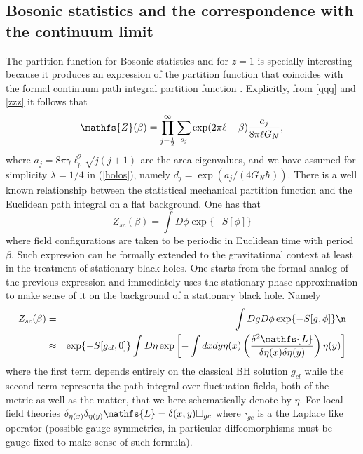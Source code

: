 \documentclass[aps, nofootinbib,superscriptaddress,12pt]{revtex4-2}
\newcommand{\nn}{\sqrt{j(j+1)}}
\def\be{\begin{equation}}
\def\ee{\end{equation}}
\def\ba{\begin{eqnarray}}
\def\ea{\end{eqnarray}}
\newcommand{\mfs}[1]{\mathfs {#1}}                               %
\newcommand{\sL}{{\mfs L}}
\newcommand{\sZ}{{\mfs Z}}
\begin{document}
\subsection{Bosonic statistics and the correspondence with the continuum limit} \label{contlim}

The partition function for Bosonic statistics and for $z=1$ is specially interesting because it produces an expression of the partition function that coincides with the formal continuum path integral partition function \cite{Ghosh:2013iwa}. Explicitly, from \eqref{qqq} and \eqref{zzz} it follows that
\be\label{z=1}
\sZ(\beta)=\prod_{j=\frac{1}{2}}^\infty \sum_{s_j} \exp(2\pi\ell-\beta)\frac{a_j}{8\pi\ell G_N},
\ee
where $a_j=8\pi\gamma\ell_p^2\nn$ are the area eigenvalues, and we have assumed for simplicity $\lambda=1/4$ in (\ref{holos}), namely $d_j=\exp(a_j/(4G_N\hbar))$. There is a well known relationship between the statistical mechanical partition function and the Euclidean path integral on a flat background.
One has that
\be
Z_{sc}(\beta)=\int D\phi \exp\{-S[\phi]\}
\ee
where field configurations are taken to be periodic in Euclidean time with period $\beta$.
Such expression can be formally extended  to the gravitational context at least in the treatment of stationary black holes.
One starts from the formal analog of the previous expression and immediately uses the stationary phase approximation to make sense of it on the background of a stationary black hole.
Namely 
\ba\label{EPI}
Z_{sc}(\beta)&=&\int Dg D\phi \exp\{-S[g, \phi]\}\n \\
&\approx& \exp\{-S[g_{cl}, 0]\} \int D\eta \exp\left[-\int dx dy \eta(x) \left(\frac{\delta^2 \sL}{\delta \eta(x)\delta \eta(y)}\right) \eta(y)\right]
\ea
where the first term depends entirely on the classical BH solution $g_{cl}$ 
while the second term represents the path integral over fluctuation fields, both of the metric as well as the matter, that we here schematically denote by $\eta$.  
For local field theories $\delta_{\eta(x)}\delta_{\eta(y)}{\sL}=\delta(x,y) \square_{gc}$ where $\square_{gc}$ is a the Laplace like operator 
(possible gauge symmetries, in particular diffeomorphisms must be gauge fixed to make sense of such formula). 
\end{document}
